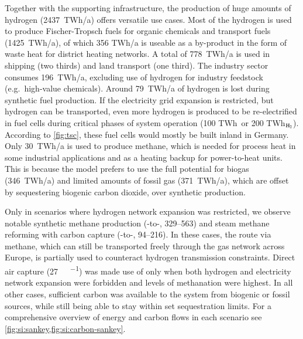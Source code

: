 Together with the supporting infrastructure, the production of huge amounts of
hydrogen (2437~TWh/a) offers versatile use cases. Most of the hydrogen is used
to produce Fischer-Tropsch fuels for organic chemicals and transport fuels
(1425~TWh/a), of which 356 TWh/a is useable as a by-product in the form of waste
heat for district heating networks. A total of 778~TWh/a is used in shipping
(two thirds) and land transport (one third). The industry sector consumes
196~TWh/a, excluding use of hydrogen for industry feedstock (e.g.~high-value
chemicals). Around 79~TWh/a of hydrogen is lost during synthetic fuel
production. If the electricity grid expansion is restricted, but hydrogen can be
transported, even more hydrogen is produced to be re-electrified in fuel cells
during critical phases of system operation (100 TWh\el~or 200 TWh$_{\ce{H2}}$).
According to \cref{fig:tsc}, these fuel cells would mostly be built inland in
Germany. Only 30~TWh/a is used to produce methane, which is needed for process
heat in some industrial applications and as a heating backup for power-to-heat
units. This is because the model prefers to use the full potential for biogas
(346~TWh/a) and limited amounts of fossil gas (371~TWh/a), which are offset by
sequestering biogenic carbon dioxide, over synthetic production.

Only in scenarios where hydrogen network expansion was restricted, we observe
notable synthetic methane production (-to-,
\SIrange{329}{563}{\twh}) and steam methane reforming with carbon capture
(-to-, \SIrange{94}{216}{\twh}). In these cases, the route via
methane, which can still be transported freely through the gas network across Europe,
is partially used to counteract hydrogen transmission constraints. Direct air
capture (\SI{27}{\mega\tco\per\year}) was made use of only when both hydrogen and electricity
network expansion were forbidden and levels of methanation were highest. In all
other cases, sufficient carbon was available to the system from biogenic or
fossil sources, while still being able to stay within set sequestration limits.
For a comprehensive overview of energy and carbon flows in each scenario see
\cref{fig:si:sankey,fig:si:carbon-sankey}.

